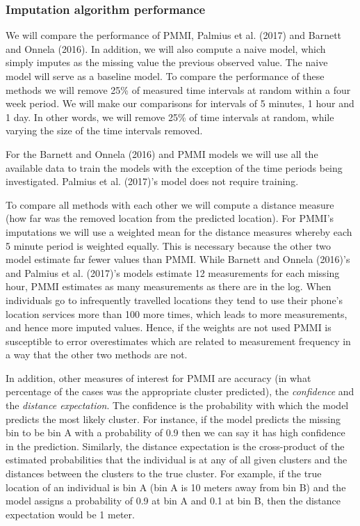 \documentclass[man]{apa6}
\theoremstyle{definition}
\theoremstyle{definition}
\theoremstyle{definition}
\theoremstyle{remark}
\begin{document}
\subsubsection{Imputation algorithm
performance}\label{imputation-algorithm-performance}

We will compare the performance of PMMI, Palmius et al. (2017) and
Barnett and Onnela (2016). In addition, we will also compute a naive
model, which simply imputes as the missing value the previous observed
value. The naive model will serve as a baseline model. To compare the
performance of these methods we will remove 25\% of measured time
intervals at random within a four week period. We will make our
comparisons for intervals of 5 minutes, 1 hour and 1 day. In other
words, we will remove 25\% of time intervals at random, while varying
the size of the time intervals removed.

For the Barnett and Onnela (2016) and PMMI models we will use all the
available data to train the models with the exception of the time
periods being investigated. Palmius et al. (2017)'s model does not
require training.

To compare all methods with each other we will compute a distance
measure (how far was the removed location from the predicted location).
For PMMI's imputations we will use a weighted mean for the distance
measures whereby each 5 minute period is weighted equally. This is
necessary because the other two model estimate far fewer values than
PMMI. While Barnett and Onnela (2016)'s and Palmius et al. (2017)'s
models estimate 12 measurements for each missing hour, PMMI estimates as
many measurements as there are in the log. When individuals go to
infrequently travelled locations they tend to use their phone's location
services more than 100 more times, which leads to more measurements, and
hence more imputed values. Hence, if the weights are not used PMMI is
susceptible to error overestimates which are related to measurement
frequency in a way that the other two methods are not.

In addition, other measures of interest for PMMI are accuracy (in what
percentage of the cases was the appropriate cluster predicted), the
\emph{confidence} and the \emph{distance expectation}. The confidence is
the probability with which the model predicts the most likely cluster.
For instance, if the model predicts the missing bin to be bin A with a
probability of 0.9 then we can say it has high confidence in the
prediction. Similarly, the distance expectation is the cross-product of
the estimated probabilities that the individual is at any of all given
clusters and the distances between the clusters to the true cluster. For
example, if the true location of an individual is bin A (bin A is 10
meters away from bin B) and the model assigns a probability of 0.9 at
bin A and 0.1 at bin B, then the distance expectation would be 1 meter.
\end{document}
